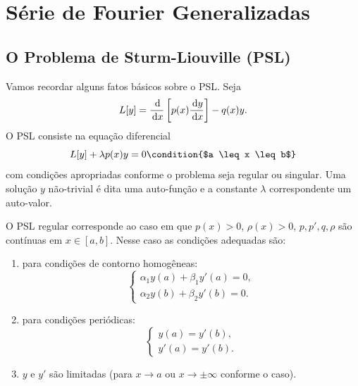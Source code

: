 %
%

%

\chapter{Série de Fourier Generalizadas}
\section{O Problema de Sturm-Liouville (PSL)}
Vamos recordar alguns fatos básicos sobre o PSL. Seja
\begin{dmath*}
  L[y] = \frac{\id{}}{\id{x}}\left[ p(x) \frac{\id{y}}{\id{x}} \right] - q(x) y.
\end{dmath*}
O PSL consiste na equação diferencial
\begin{dmath*}
  L[y] + \lambda p(x) y = 0 \condition{$a \leq x \leq b$}
\end{dmath*}
com condições apropriadas conforme o problema seja regular ou singular. Uma
solução $y$ não-trivial é dita uma auto-função e a constante $\lambda$
correspondente um auto-valor.

O PSL regular corresponde ao caso em que $p(x) > 0$, $\rho(x) > 0$, $p, p', q,
\rho$ são contínuas em $x \in [a,b]$. Nesse caso as condições adequadas são:
\begin{enumerate}
  \item para condições de contorno homogêneas:
    \begin{dmath*}
      \begin{cases}
        \alpha_1 y(a) + \beta_1 y'(a) = 0, \\
        \alpha_2 y(b) + \beta_2 y'(b) = 0.
      \end{cases}
    \end{dmath*}
  \item para condições periódicas:
    \begin{dmath*}
      \begin{cases}
        y(a) = y'(b), \\
        y'(a) = y'(b).
      \end{cases}
    \end{dmath*}
  \item $y$ e $y'$ são limitadas (para $x \to a$ ou $x \to \pm \infty$ conforme
    o caso).
\end{enumerate}

